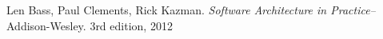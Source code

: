 













\begin{thebibliography}{9}
	Len Bass, Paul Clements, Rick Kazman.
	\emph{Software Architecture in Practice–}
	Addison-Wesley.
	3rd edition,
	2012
\end{thebibliography}
